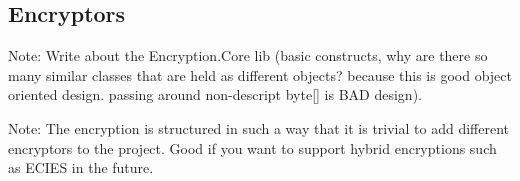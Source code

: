 \subsection{Encryptors}

Note: Write about the Encryption.Core lib (basic constructs, why are there so many similar classes that are held
as different objects? because this is good object oriented design. passing around non-descript byte[] is BAD design).

Note: The encryption is structured in such a way that it is trivial to add different encryptors to the project. Good
if you want to support hybrid encryptions such as ECIES in the future.